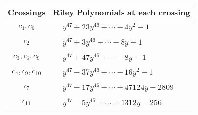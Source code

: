 \documentclass[1p]{elsarticle_modified}
\theoremstyle{definition}
\begin{document}
\begin{tabular}{m{50pt}|m{274pt}}
Crossings & \hspace{64pt}Riley Polynomials at each crossing \\
\hline $$\begin{aligned}c_{1},c_{6}\end{aligned}$$&$\begin{aligned}
&y^{47}+23 y^{46}+\cdots-4 y^2-1
\end{aligned}$\\
\hline $$\begin{aligned}c_{2}\end{aligned}$$&$\begin{aligned}
&y^{47}+3 y^{46}+\cdots-8 y-1
\end{aligned}$\\
\hline $$\begin{aligned}c_{3},c_{5},c_{8}\end{aligned}$$&$\begin{aligned}
&y^{47}+47 y^{46}+\cdots-8 y-1
\end{aligned}$\\
\hline $$\begin{aligned}c_{4},c_{9},c_{10}\end{aligned}$$&$\begin{aligned}
&y^{47}-37 y^{46}+\cdots-16 y^2-1
\end{aligned}$\\
\hline $$\begin{aligned}c_{7}\end{aligned}$$&$\begin{aligned}
&y^{47}-17 y^{46}+\cdots+47124 y-2809
\end{aligned}$\\
\hline $$\begin{aligned}c_{11}\end{aligned}$$&$\begin{aligned}
&y^{47}-5 y^{46}+\cdots+1312 y-256
\end{aligned}$\\
\hline
\end{tabular}
\vskip 2pc
\end{document}
